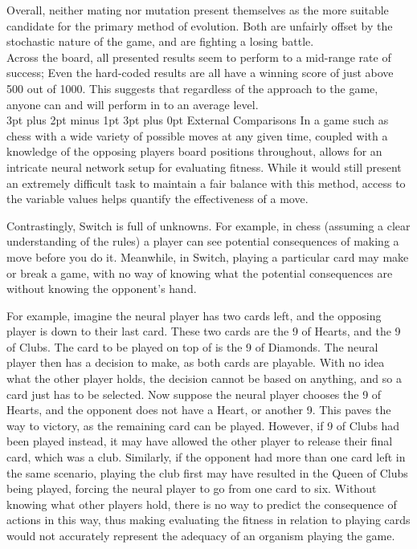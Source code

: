 \documentclass[12pt,a4paper]{article}
\makeatletter
\renewcommand\subsection{\@startsection {subsection}{1}{2mm} %
                               {3pt plus 2pt minus 1pt} %
                               {3pt plus 0pt} %
                               {\normalfont\bfseries}}
\makeatother
\begin{document}
Overall, neither mating nor mutation present themselves as the more suitable candidate for the primary method of evolution. Both are unfairly offset by the stochastic nature of the game, and are fighting a losing battle.\\

Across the board, all presented results seem to perform to a mid-range rate of success; Even the hard-coded results are all have a winning score of just above 500 out of 1000. This suggests that regardless of the approach to the game, anyone can and will perform in to an average level.\\

\subsection{External Comparisons}
In a game such as chess with a wide variety of possible moves at any given time, coupled with a knowledge of the opposing players board positions throughout, allows for an intricate neural network setup for evaluating fitness. While it would still present an extremely difficult task to maintain a fair balance with this method, access to the variable values helps quantify the effectiveness of a move.

Contrastingly, Switch is full of unknowns. For example, in chess (assuming a clear understanding of the rules) a player can see potential consequences of making a move before you do it. Meanwhile, in Switch, playing a particular card may make or break a game, with no way of knowing what the potential consequences are without knowing the opponent's hand. 

For example, imagine the neural player has two cards left, and the opposing player is down to their last card. These two cards are the 9 of Hearts, and the 9 of Clubs. The card to be played on top of is the 9 of Diamonds. The neural player then has a decision to make, as both cards are playable. With no idea what the other player holds, the decision cannot be based on anything, and so a card just has to be selected. Now suppose the neural player chooses the 9 of Hearts, and the opponent does not have a Heart, or another 9. This paves the way to victory, as the remaining card can be played. However, if 9 of Clubs had been played instead, it may have allowed the other player to release their final card, which was a club. Similarly, if the opponent had more than one card left in the same scenario, playing the club first may have resulted in the Queen of Clubs being played, forcing the neural player to go from one card to six. Without knowing what other players hold, there is no way to predict the consequence of actions in this way, thus making evaluating the fitness in relation to playing cards would not accurately represent the adequacy of an organism playing the game. 
\end{document}
